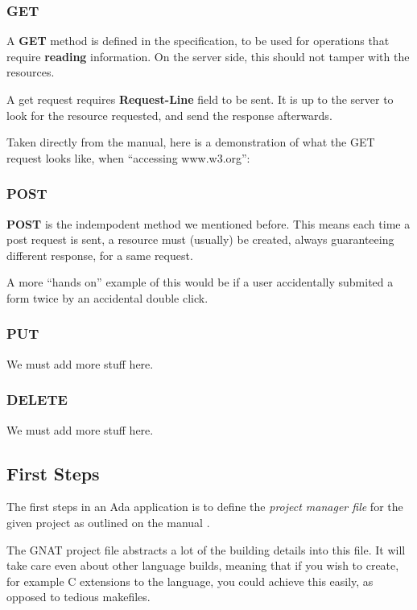 \subsubsection{GET} 
A \textbf{GET} method is defined in the specification, to be used for operations that
require \textbf{reading} information. On the server side, this should not
tamper with the resources. 

A get request requires \textbf{Request-Line} field to be sent. It is up to the
server to look for the resource requested, and send the response afterwards.

Taken directly from the manual, here is a demonstration of what the GET request
looks like, when ``accessing www.w3.org'':


\subsubsection{POST}
\textbf{POST} is the indempodent method we mentioned before. This means each
time a post request is sent, a resource must (usually) be created, always
guaranteeing different response, for a same request.

A more ``hands on'' example of this would be if a user accidentally submited a
form twice by an accidental double click.

\subsubsection{PUT}
We must add more stuff here.

\subsubsection{DELETE} 
We must add more stuff here.

\subsection{First Steps}
The first steps in an Ada application is to define the \textit{project manager 
file} for the given project as outlined on the manual \cite{GNATintro}.

The GNAT project file abstracts a lot of the building details into this file.
It will take care even about other language builds, meaning that if you wish to
create, for example C extensions to the language, you could achieve this
easily, as opposed to tedious makefiles. 

